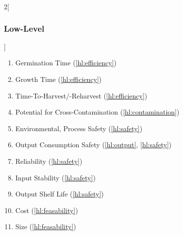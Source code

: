 \documentclass{report}
\begin{document}
\begin{multicols}{2}[\subsubsection{Low-Level}\label{sec:llos}]
\begin{enumerate}[label=LL\arabic*., ref=LL\arabic*]
        \item \label{ll:time_germination} Germination Time \hfill (\ref{hl:efficiency})
        \item \label{ll:time_growth} Growth Time \hfill (\ref{hl:efficiency})
        \item \label{ll:time_harvest} Time-To-Harvest/-Reharvest \hfill (\ref{hl:efficiency})
        \item \label{ll:crosscontamination} Potential for Cross-Contamination \hfill (\ref{hl:contamination})
        \item \label{ll:safety_process} Environmental, Process Safety \hfill (\ref{hl:safety})
        \item \label{ll:output_safety} Output Consumption Safety \hfill (\ref{hl:output}, \ref{hl:safety})
        \item \label{ll:reliability} Reliability \hfill (\ref{hl:safety})
        \item \label{ll:stability_input} Input Stability \hfill (\ref{hl:safety})
        \item \label{ll:stability_output} Output Shelf Life \hfill (\ref{hl:safety})
        \item \label{ll:cost} Cost \hfill (\ref{hl:feasability})
        \item \label{ll:size} Size \hfill (\ref{hl:feasability})
    \end{enumerate}
\end{multicols}
\end{document}
